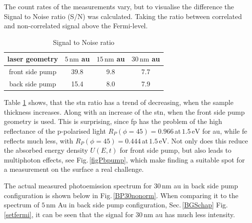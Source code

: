 \documentclass[a4paper,12pt,twoside]{article}
\begin{document}
The count rates of the measurements vary, but to visualise the difference the Signal to Noise ratio (S/N) was calculated. Taking the ratio between correlated and non-correlated signal above the Fermi-level.
	\begin{table}[H]
	    \centering
		\caption{Signal to Noise ratio}
		\begin{tabular}{cccc}
			laser geometry & $5\,\mathrm{\mbox{nm}}$ \gls{au} & $15\,\mathrm{\mbox{nm}}$ \gls{au} & $30\,\mathrm{\mbox{nm}}$ \gls{au} \\
			\hline
			front side pump & 39.8 & 9.8 & 7.7 \\
			back side pump & 15.4 & 8.0 & 7.9 \\
		\end{tabular}
    		\label{stn}
	\end{table}
Table \ref{stn} shows, that the \gls{stn} ratio has a trend of decreasing, when the sample thickness increases. Along with an increase of the \gls{stn}, when the front side pump geometry is used. This is surprising, since \gls{fp} has the problem of the high reflectance of the p-polarised light $R_{ P }(\phi = 45) = 0.966 \,$at$\,1.5\,\mathrm{\mbox{eV}}$ for \gls{au}, while \gls{fe} reflects much less, with $R_{ P }(\phi = 45) = 0.444 \,$at$\,1.5\,\mathrm{\mbox{eV}}$. Not only does this reduce the absorbed energy density $U(E,t)$ for front side pump, but also leads to multiphoton effects, see Fig.\,\ref{figPbpump}, which make finding a suitable spot for a measurement on the surface a real challenge.

The actual measured photoemission spectrum for $30\,\mathrm{\mbox{nm}}$ \gls{au} in back side pump configuration is shown below in Fig.\,\ref{BP30nonorm}. When comparing it to the spectrum of $5\,\mathrm{\mbox{nm}}$ Au in back side pump configuration, Sec.\,\ref{BGSchap} Fig.\,\ref{setfermi}, it can be seen that the signal for $30\,\mathrm{\mbox{nm}}$ \gls{au} has much less intensity.
\end{document}
